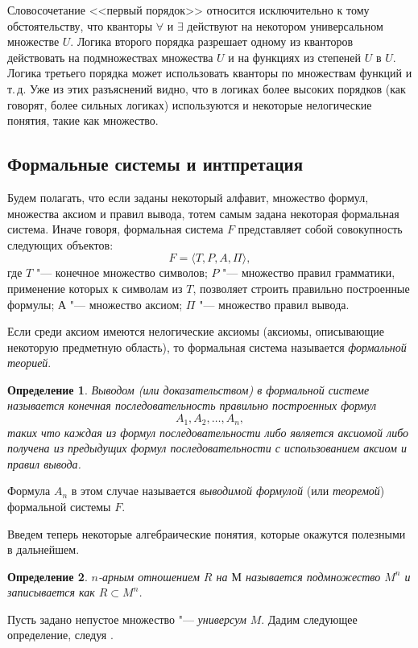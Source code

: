 \documentclass[b5paper,11pt]{book}
\newtheorem{Def}{Определение}
\begin{document}
	Словосочетание <<первый порядок>> относится исключительно к тому обстоятельству, что кванторы $\forall$ и $\exists$ действуют на некотором универсальном множестве $U$. Логика второго порядка разрешает одному из кванторов действовать на подмножествах множества $U$ и на функциях из степеней $U$ в $U$. Логика третьего порядка может использовать кванторы по множествам функций и т.\,д. Уже из этих разъяснений видно, что в логиках более высоких порядков (как говорят, более сильных логиках) используются и некоторые нелогические понятия, такие как множество.
	
	\subsection{Формальные системы и интпретация}
	Будем полагать, что если заданы некоторый алфавит, множество формул, множества аксиом  и правил вывода, тотем самым задана некоторая формальная система. Иначе говоря, формальная система $F$ представляет собой совокупность следующих объектов:
	\[
		F=\langle T, P, A, \Pi\rangle,
	\]
	где $T$ "--- конечное множество символов; $P$ "--- множество правил грамматики, применение которых к символам из $T$, позволяет строить правильно построенные формулы; $А$ "--- множество аксиом;	$\Pi$ "--- множество правил вывода. 
	
	Если среди аксиом имеются нелогические аксиомы (аксиомы, описывающие некоторую предметную область), то формальная система называется \textit{формальной теорией}.
	\begin{Def}
		\textit{Выводом} (или \textit{доказательством}) в формальной системе называется конечная последовательность правильно построенных формул 
		\[
			A_1,A_2,\dots,A_n,
		\] таких что каждая из формул последовательности либо является аксиомой либо получена из предыдущих формул последовательности с использованием аксиом и правил вывода.
	\end{Def}
	
	Формула $A_n$ в этом случае называется \textit{выводимой формулой} (или \textit{теоремой}) формальной системы $F$.
	
	Введем теперь некоторые алгебраические понятия, которые окажутся полезными в дальнейшем.
	
	\begin{Def}
		$n$-арным отношением $R$ на $М$ называется подмножество $M^n$ и записывается как $R\subset M^n$.
	\end{Def}
	
	Пусть задано непустое множество "--- \textit{универсум} $M$. Дадим следующее определение, следуя \cite{Maltcev1970}.
	
\end{document}
